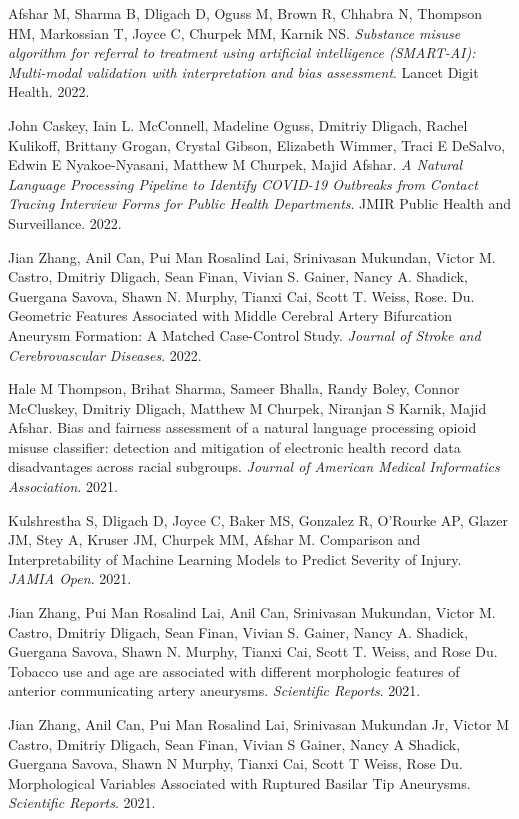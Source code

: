 \documentclass[letterpaper]{article}
\renewenvironment{itemize}{
  \begin{list}{}{
    \setlength{\leftmargin}{1.5em}
  }
}{
  \end{list}
}
\begin{document}
\begin{itemize}
\item Afshar M, Sharma B, Dligach D, Oguss M, Brown R, Chhabra N, Thompson HM, Markossian T, Joyce C, Churpek MM, Karnik NS. \emph{Substance misuse algorithm for referral to treatment using artificial intelligence (SMART-AI): Multi-modal validation with interpretation and bias assessment}. Lancet Digit Health. 2022.
\item John Caskey, Iain L. McConnell, Madeline Oguss, Dmitriy Dligach, Rachel Kulikoff, Brittany Grogan, Crystal Gibson, Elizabeth Wimmer, Traci E DeSalvo, Edwin E Nyakoe-Nyasani, Matthew M Churpek, Majid Afshar. \emph{A Natural Language Processing Pipeline to Identify COVID-19 Outbreaks from Contact Tracing Interview Forms for Public Health Departments}. JMIR Public Health and Surveillance. 2022.
\item Jian Zhang, Anil Can, Pui Man Rosalind Lai, Srinivasan Mukundan, Victor M. Castro, Dmitriy Dligach, Sean Finan, Vivian S. Gainer, Nancy A. Shadick, Guergana Savova, Shawn N. Murphy, Tianxi Cai, Scott T. Weiss, Rose. Du. Geometric Features Associated with Middle Cerebral Artery Bifurcation Aneurysm Formation: A Matched Case-Control Study. \emph{Journal of Stroke and Cerebrovascular Diseases}. 2022.
\item Hale M Thompson, Brihat Sharma, Sameer Bhalla, Randy Boley, Connor McCluskey, Dmitriy Dligach, Matthew M Churpek, Niranjan S Karnik, Majid Afshar. Bias and fairness assessment of a natural language processing opioid misuse classifier: detection and mitigation of electronic health record data disadvantages across racial subgroups. \emph{Journal of American Medical Informatics Association}. 2021.
\item Kulshrestha S, Dligach D, Joyce C, Baker MS, Gonzalez R, O’Rourke AP, Glazer JM, Stey A, Kruser JM, Churpek MM, Afshar M. Comparison and Interpretability of Machine Learning Models to Predict Severity of Injury. \emph{JAMIA Open}. 2021.
\item Jian Zhang, Pui Man Rosalind Lai, Anil Can, Srinivasan Mukundan, Victor M. Castro, Dmitriy Dligach, Sean Finan, Vivian S. Gainer, Nancy A. Shadick, Guergana Savova, Shawn N. Murphy, Tianxi Cai, Scott T. Weiss, and Rose Du. Tobacco use and age are associated with different morphologic features of anterior communicating artery aneurysms. \emph{Scientific Reports}. 2021.
\item Jian Zhang, Anil Can, Pui Man Rosalind Lai, Srinivasan Mukundan Jr, Victor M Castro, Dmitriy Dligach, Sean Finan, Vivian S Gainer, Nancy A Shadick, Guergana Savova, Shawn N Murphy, Tianxi Cai, Scott T Weiss, Rose Du. Morphological Variables Associated with Ruptured Basilar Tip Aneurysms. \emph{Scientific Reports}. 2021.

\end{itemize}
\end{document}
